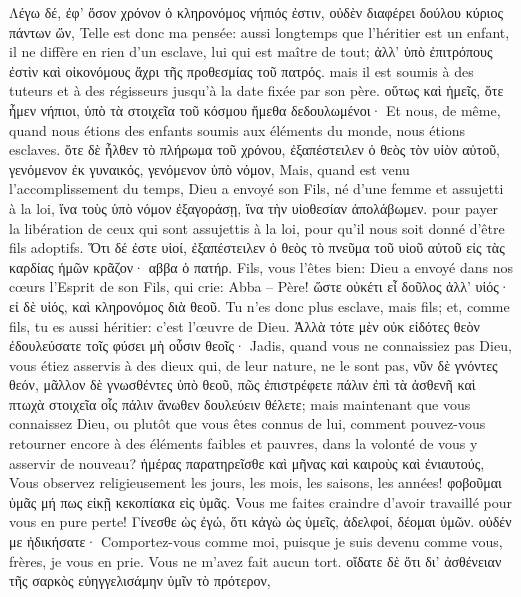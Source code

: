 \documentclass[14pt,a4paper,twoside]{extarticle}
\begin{document}
\begin{paracol}[1]
  \verset
  {Λέγω δέ, ἐφ’ ὅσον χρόνον ὁ κληρονόμος νήπιός ἐστιν, οὐδὲν διαφέρει δούλου κύριος πάντων ὤν,}
  {Telle est donc ma pensée: aussi longtemps que l’héritier est un enfant, il ne diffère en rien d’un esclave, lui qui est maître de tout;}
  \verset
  {ἀλλ’ ὑπὸ ἐπιτρόπους ἐστὶν καὶ οἰκονόμους ἄχρι τῆς προθεσμίας τοῦ πατρός.}
  {mais il est soumis à des tuteurs et à des régisseurs jusqu’à la date fixée par son père.}
  \verset
  {οὕτως καὶ ἡμεῖς, ὅτε ἦμεν νήπιοι, ὑπὸ τὰ στοιχεῖα τοῦ κόσμου ἤμεθα δεδουλωμένοι·}
  {Et nous, de même, quand nous étions des enfants soumis aux éléments du monde, nous étions esclaves.}
  \verset
  {ὅτε δὲ ἦλθεν τὸ πλήρωμα τοῦ χρόνου, ἐξαπέστειλεν ὁ θεὸς τὸν υἱὸν αὐτοῦ, γενόμενον ἐκ γυναικός, γενόμενον ὑπὸ νόμον,}
  {Mais, quand est venu l’accomplissement du temps, Dieu a envoyé son Fils, né d’une femme et assujetti à la loi,}
  \verset
  {ἵνα τοὺς ὑπὸ νόμον ἐξαγοράσῃ, ἵνα τὴν υἱοθεσίαν ἀπολάβωμεν.}
  {pour payer la libération de ceux qui sont assujettis à la loi, pour qu’il nous soit donné d’être fils adoptifs.}
  \verset
  {Ὅτι δέ ἐστε υἱοί, ἐξαπέστειλεν ὁ θεὸς τὸ πνεῦμα τοῦ υἱοῦ αὐτοῦ εἰς τὰς καρδίας ἡμῶν κρᾶζον· αββα ὁ πατήρ.}
  {Fils, vous l’êtes bien: Dieu a envoyé dans nos cœurs l’Esprit de son Fils, qui crie: Abba – Père!}
  \verset
  {ὥστε οὐκέτι εἶ δοῦλος ἀλλ’ υἱός· εἰ δὲ υἱός, καὶ κληρονόμος διὰ θεοῦ.}
  {Tu n’es donc plus esclave, mais fils; et, comme fils, tu es aussi héritier: c’est l’œuvre de Dieu.}
  \verset
  {Ἀλλὰ τότε μὲν οὐκ εἰδότες θεὸν ἐδουλεύσατε τοῖς φύσει μὴ οὖσιν θεοῖς·}
  {Jadis, quand vous ne connaissiez pas Dieu, vous étiez asservis à des dieux qui, de leur nature, ne le sont pas,}
  \verset
  {νῦν δὲ γνόντες θεόν, μᾶλλον δὲ γνωσθέντες ὑπὸ θεοῦ, πῶς ἐπιστρέφετε πάλιν ἐπὶ τὰ ἀσθενῆ καὶ πτωχὰ στοιχεῖα οἷς πάλιν ἄνωθεν δουλεύειν θέλετε;}
  {mais maintenant que vous connaissez Dieu, ou plutôt que vous êtes connus de lui, comment pouvez-vous retourner encore à des éléments faibles et pauvres, dans la volonté de vous y asservir de nouveau?}
  \verset
  {ἡμέρας παρατηρεῖσθε καὶ μῆνας καὶ καιροὺς καὶ ἐνιαυτούς,}
  {Vous observez religieusement les jours, les mois, les saisons, les années!}
  \verset
  {φοβοῦμαι ὑμᾶς μή πως εἰκῇ κεκοπίακα εἰς ὑμᾶς.}
  {Vous me faites craindre d’avoir travaillé pour vous en pure perte!}
  \verset
  {Γίνεσθε ὡς ἐγώ, ὅτι κἀγὼ ὡς ὑμεῖς, ἀδελφοί, δέομαι ὑμῶν. οὐδέν με ἠδικήσατε·}
  {Comportez-vous comme moi, puisque je suis devenu comme vous, frères, je vous en prie. Vous ne m’avez fait aucun tort.}
  \verset
  {οἴδατε δὲ ὅτι δι’ ἀσθένειαν τῆς σαρκὸς εὐηγγελισάμην ὑμῖν τὸ πρότερον,}

\end{paracol}
\end{document}
